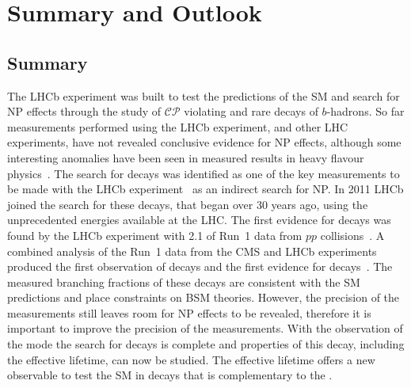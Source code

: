 \chapter{{\bf Summary and Outlook}}
\label{sec:summaryandoutlook}

\section{Summary}
The LHCb experiment was built to test the predictions of the SM and search for NP effects through the study of $\mathcal{CP}$ violating and rare decays of $b$-hadrons. So far measurements performed using the LHCb experiment, and other LHC experiments, have not revealed conclusive evidence for NP effects, although some interesting anomalies have been seen in measured results in heavy flavour physics~\cite{PhysRevLett.118.111801,Aaij:2014pli, Aaij:2015oid, ATLAS-CONF-2017-023,CMS-PAS-BPH-15-008,Aaij:2015esa,PhysRevLett.113.151601,Aaij:2017vbb,Aaij:2015yra,Huschle:2015rga, Lees:2012xj,Lees:2013uzd, Sato:2016svk,Altmannshofer:2017yso,Capdevila:2017bsm,Amhis:2016xyh}. 
The search for \bmumu decays was identified as one of the key measurements to be made with the LHCb experiment~\cite{Adeva:2009ny} as an indirect search for NP.
In 2011 LHCb joined the search for these decays, that began over 30 years ago, using the unprecedented energies available at the LHC. The first evidence for \bsmumu decays was found by the LHCb experiment with 2.1 \fb of Run~1 data from $pp$ collisions~\cite{Aaij:2012nna}. A combined analysis of the Run~1 data from the CMS and LHCb experiments produced the first observation of \bsmumu decays and the first evidence for \bdmumu decays~\cite{CMS:2014xfa}. The measured branching fractions of these decays are consistent with the SM predictions and place constraints on BSM theories. However, the precision of the measurements still leaves room for NP effects to be revealed, therefore it is important to improve the precision of the \BF measurements. With the observation of the \bs mode the search for \bsmumu decays is complete and properties of this decay, including the effective lifetime, can now be studied. The effective lifetime offers a new observable to test the SM in \bsmumu decays that is complementary to the \BF. 

